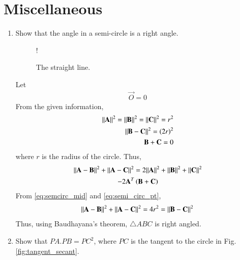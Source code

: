 \documentclass[journal,12pt,twocolumn]{IEEEtran}
\renewcommand\thesection{\arabic{section}}
\begin{document}
\section{Miscellaneous}
\begin{enumerate}[label=\thesection.\arabic*
,ref=\thesection.\theenumi]
%
\item Show that the angle in a semi-circle is a right angle.
\begin{figure}[!h]
\centering
\resizebox {\columnwidth} {!} {

}
\caption{The straight line.}
\label{fig:ch2_line}
\end{figure}
\solution Let 
\begin{align}
\vec{O} = 0
\end{align}
From the given information,
\begin{align}
\label{eq:semi_circ_pt}
\lVert\mathbf{A}\rVert^2 = \lVert\mathbf{B}\rVert^2 = \lVert\mathbf{C}\rVert^2 = r^2
\\
\lVert\mathbf{B}-\mathbf{C}\rVert^2 =  \left(2r\right)^2
\\
\mathbf{B} + \mathbf{C} = 0
\label{eq:semcirc_mid}
\end{align}
%
where $r$ is the radius of the circle. Thus,
\begin{multline}
\lVert\mathbf{A}-\mathbf{B}\rVert^2 + \lVert\mathbf{A}-\mathbf{C}\rVert^2 = 
2\lVert\mathbf{A}\rVert^2 + \lVert\mathbf{B}\rVert^2 + \lVert\mathbf{C}\rVert^2
\\
-2\mathbf{A}^T\left(\mathbf{B}+\mathbf{C}\right)
\end{multline}
From \eqref{eq:semcirc_mid} and \eqref{eq:semi_circ_pt},
\begin{multline}
\lVert\mathbf{A}-\mathbf{B}\rVert^2 + \lVert\mathbf{A}-\mathbf{C}\rVert^2 = 4r^2 = \lVert\mathbf{B}-\mathbf{C}\rVert^2 
\end{multline}
Thus, using Baudhayana's theorem, $\triangle ABC$ is right angled.
\item 	Show that $PA.PB = PC^2$, where $PC$ is the tangent to the circle in Fig. \ref{fig:tangent_secant}.

	\begin{figure}[!hb]
		\begin{center}
			

\end{center}
\end{figure}
\end{enumerate}
\end{document}
